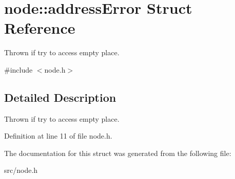\hypertarget{structnode_1_1addressError}{\section{node\-:\-:address\-Error Struct Reference}
\label{structnode_1_1addressError}
}


Thrown if try to access empty place.  




{\ttfamily \#include $<$node.\-h$>$}



\subsection{Detailed Description}
Thrown if try to access empty place. 

Definition at line 11 of file node.\-h.



The documentation for this struct was generated from the following file\-:\begin{DoxyCompactItemize}
\item 
src/node.\-h\end{DoxyCompactItemize}
